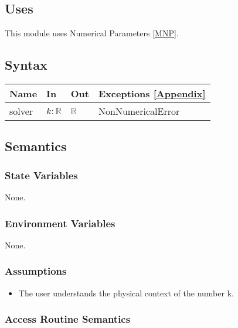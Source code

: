 \documentclass[12pt, titlepage]{article}
\begin{document}
\subsection{Uses}

This module uses Numerical Parameters \ref{MNP}. 

\subsection{Syntax}

\begin{center}
	\begin{tabular}{p{2cm} p{4cm} p{4cm} p{3cm}}
		\hline
		\textbf{Name} & \textbf{In} & \textbf{Out} & \textbf{Exceptions} 
		\ref{Appendix} \\
		\hline
		solver & $k : \mathbb{R}$ & $\mathbb{R}$ & 
		NonNumericalError \\ 
		\hline
	\end{tabular}
\end{center}

\subsection{Semantics}

\subsubsection{State Variables}

None.

\subsubsection{Environment Variables}

None.

\subsubsection{Assumptions}

\begin{itemize}
	\item The user understands the physical context of the number k.  
\end{itemize}

\subsubsection{Access Routine Semantics}
\end{document}
